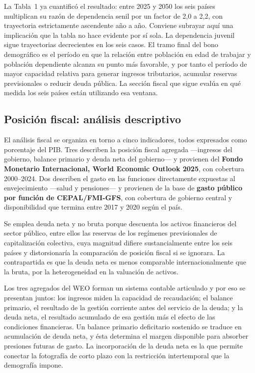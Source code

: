 \documentclass[12pt, letterpaper]{article}
\begin{document}
La Tabla~1 ya cuantificó el resultado: entre 2025 y 2050 los seis países
multiplican su razón de dependencia senil por un factor de 2,0 a 2,2, con trayectoria
estrictamente ascendente año a año. Conviene subrayar aquí una implicación que la
tabla no hace evidente por sí sola. La dependencia juvenil sigue trayectorias
decrecientes en los seis casos. El tramo final del
bono demográfico es el período en que la relación entre población en edad de trabajar y población dependiente alcanza su punto más favorable, y por tanto el período de mayor
capacidad relativa para generar ingresos tributarios, acumular reservas previsionales o reducir deuda pública. La sección fiscal que sigue evalúa en qué medida los seis países están utilizando esa ventana.

\subsection{Posición fiscal: análisis descriptivo}

El análisis fiscal se organiza en torno a cinco indicadores, todos expresados como
porcentaje del PIB. Tres describen la posición fiscal agregada —ingresos del gobierno, balance primario y deuda neta del gobierno— y provienen del
\textbf{Fondo Monetario Internacional, World Economic Outlook 2025}, con cobertura 2000--2024. Dos describen el gasto en las funciones directamente expuestas al envejecimiento —salud y pensiones— y provienen de la base de
\textbf{gasto público por función de CEPAL/FMI-GFS}, con cobertura de gobierno central
y disponibilidad que termina entre 2017 y 2020 según el país.

Se emplea deuda neta y no bruta porque descuenta los activos financieros del sector
público, entre ellos las reservas de los regímenes previsionales de capitalización
colectiva, cuya magnitud difiere sustancialmente entre los seis países y
distorsionaría la comparación de posición fiscal si se ignorara. La contrapartida
es que la deuda neta es menos comparable internacionalmente que la bruta, por la
heterogeneidad en la valuación de activos.

Los tres agregados del WEO forman un sistema contable articulado y por eso se presentan
juntos: los ingresos miden la capacidad de recaudación; el balance primario, el resultado de la gestión corriente antes del servicio de la deuda; y la deuda neta, el
resultado acumulado de esa gestión más el efecto de las condiciones financieras. Un balance primario deficitario sostenido se traduce en acumulación de deuda neta, y ésta
determina el margen disponible para absorber presiones futuras de gasto. La
incorporación de la deuda neta es la que permite conectar la fotografía de corto plazo
con la restricción intertemporal que la demografía impone.
\end{document}
